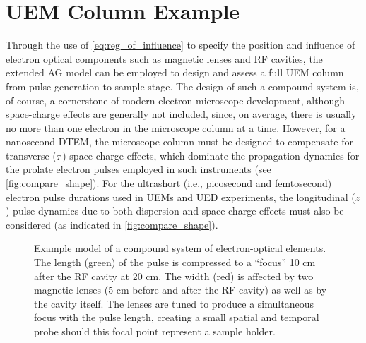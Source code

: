 
\section{UEM Column Example} \label{sec:compound}

Through the use of \ref{eq:reg_of_influence} to specify the position and influence of electron optical components such as magnetic lenses and RF cavities, the extended AG model can be employed to design and assess a full UEM column from pulse generation to sample stage.
The design of such a compound system is, of course, a cornerstone of modern electron microscope development, although space-charge effects are generally not included, since, on average, there is usually no more than one electron in the microscope column at a time.
However, for a nanosecond DTEM,\cite{lagrange_nanosecond_2008,reed_evolution_2009} the microscope column must be designed to compensate for transverse ($\smallT$) space-charge effects, which dominate the propagation dynamics for the prolate electron pulses employed in such instruments (see \ref{fig:compare_shape}).
For the ultrashort (i.e., picosecond and femtosecond) electron pulse durations used in UEMs\cite{park_direct_2009} and UED experiments,\cite{oudheusden_electron_2007} the longitudinal ($z$) pulse dynamics due to both dispersion and space-charge effects must also be considered (as indicated in \ref{fig:compare_shape}).

\begin{figure}
  \centering
  \begin{tikzpicture}
    
  \end{tikzpicture}
  \caption[Example model of a compound system of electron-optical elements]{
    Example model of a compound system of electron-optical elements.
    The length (green) of the pulse is compressed to a ``focus'' 10 cm after the RF cavity at 20 cm.
    The width (red) is affected by two magnetic lenses (5 cm before and after the RF cavity) as well as by the cavity itself.
    The lenses are tuned to produce a simultaneous focus with the pulse length, creating a small spatial and temporal probe should this focal point represent a sample holder.
  }
  \label{fig:compound}
\end{figure}

